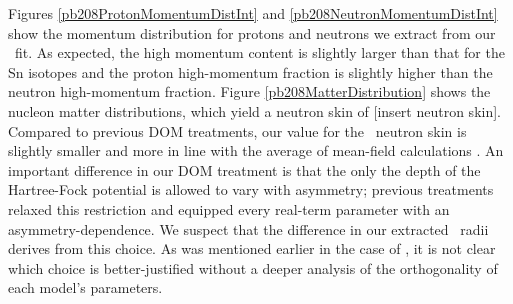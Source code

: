 Figures \ref{pb208ProtonMomentumDistInt} and \ref{pb208NeutronMomentumDistInt} show the momentum 
distribution for protons and neutrons we extract from
our \pbEight\ fit. As expected, the high momentum content is slightly larger than that for the Sn
isotopes and the proton high-momentum fraction is slightly higher than the neutron high-momentum
fraction. Figure \ref{pb208MatterDistribution} shows the nucleon matter distributions, which yield a
neutron skin of [insert neutron skin]. Compared to previous DOM treatments, our value for the
\pbEight\ neutron skin is slightly smaller and more in line with the average of mean-field
calculations \cite{Fattoyev2012}. An important difference in our DOM treatment is that the only the
depth of the Hartree-Fock potential is allowed to vary with asymmetry; previous treatments
relaxed this restriction and equipped every real-term parameter with an asymmetry-dependence. We
suspect that the difference in our extracted \pbEight\ radii derives from this choice. As was
mentioned earlier in the case of \caEight, it is not clear which choice is better-justified without
a deeper analysis of the orthogonality of each model's parameters.
